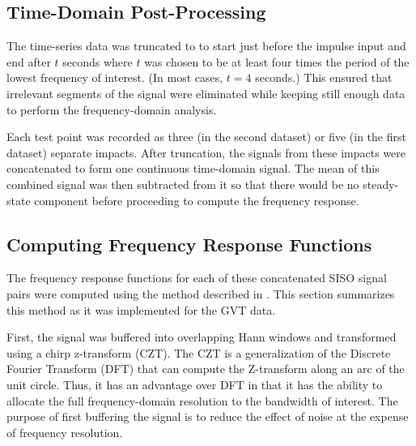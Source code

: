 \subsection{Time-Domain Post-Processing}

The time-series data was truncated to to start just before the impulse input and end after $t$ seconds where $t$ was chosen to be at least four times the period of the lowest frequency of interest. (In most cases, $t=4$ seconds.) This ensured that irrelevant segments of the signal were eliminated while keeping still enough data to perform the frequency-domain analysis.

Each test point was recorded as three (in the second dataset) or five (in the first dataset) separate impacts. After truncation, the signals from these impacts were concatenated to form one continuous time-domain signal. The mean of this combined signal was then subtracted from it so that there would be no steady-state component before proceeding to compute the frequency response.

\subsection{Computing Frequency Response Functions}

The frequency response functions for each of these concatenated SISO signal pairs were computed using the method described in \cite{Tischler2012}. This section summarizes this method as it was implemented for the GVT data.

First, the signal was buffered into overlapping Hann windows and transformed using a chirp z-transform (CZT). The CZT is a generalization of the Discrete Fourier Transform (DFT) that can compute the Z-transform along an arc of the unit circle. Thus, it has an advantage over DFT in that it has the ability to allocate the full frequency-domain resolution to the bandwidth of interest. The purpose of first buffering the signal is to reduce the effect of noise at the expense of frequency resolution.


